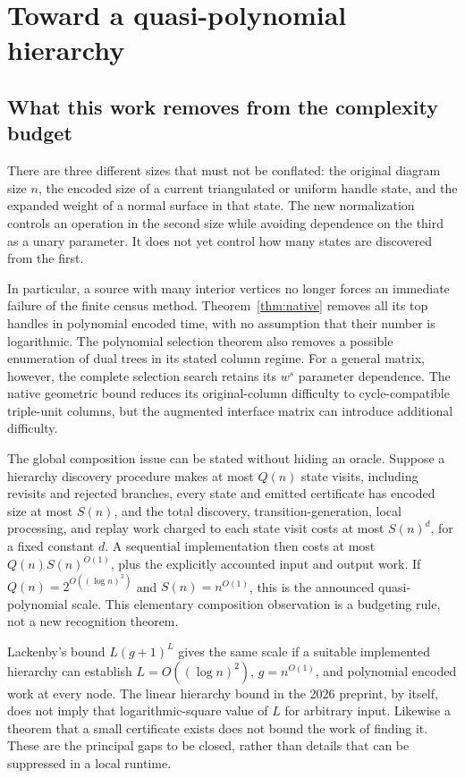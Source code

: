 \section{Toward a quasi-polynomial hierarchy}
\label{sec:research}

\subsection{What this work removes from the complexity budget}
There are three different sizes that must not be conflated: the original
diagram size $n$, the encoded size of a current triangulated or uniform
handle state, and the expanded weight of a normal surface in that state.
The new normalization controls an operation in the second size while
avoiding dependence on the third as a unary parameter.  It does not yet
control how many states are discovered from the first.

In particular, a source with many interior vertices no longer forces an
immediate failure of the finite census method.  Theorem~\ref{thm:native}
removes all its top handles in polynomial encoded time, with no assumption
that their number is logarithmic.  The polynomial selection theorem also
removes a possible enumeration of dual trees in its stated column regime.
For a general matrix, however, the complete selection search retains its
$w^s$ parameter dependence.  The native geometric bound reduces its
original-column difficulty to cycle-compatible triple-unit columns, but
the augmented interface matrix can introduce additional difficulty.

The global composition issue can be stated without hiding an oracle.
Suppose a hierarchy discovery procedure makes at most $Q(n)$ state visits,
including revisits and rejected branches,
every state and emitted certificate has encoded size at most $S(n)$,
and the total discovery, transition-generation, local processing, and replay
work charged to each state visit costs at most $S(n)^d$, for a fixed
constant $d$.  A sequential implementation then costs at most
$Q(n)S(n)^{O(1)}$, plus the explicitly accounted input and output work.
If $Q(n)=2^{O((\log n)^3)}$ and $S(n)=n^{O(1)}$, this is the announced
quasi-polynomial scale.  This elementary composition observation is a
budgeting rule, not a new recognition theorem.

Lackenby's bound $L(g+1)^L$ gives the same scale if a suitable implemented
hierarchy can establish $L=O((\log n)^2)$, $g=n^{O(1)}$, and polynomial
encoded work at every node.  The linear hierarchy bound in the 2026
preprint, by itself, does not imply that logarithmic-square value of $L$
for arbitrary input.  Likewise a theorem that a small certificate exists
does not bound the work of finding it.  These are the principal gaps to
be closed, rather than details that can be suppressed in a local runtime.

